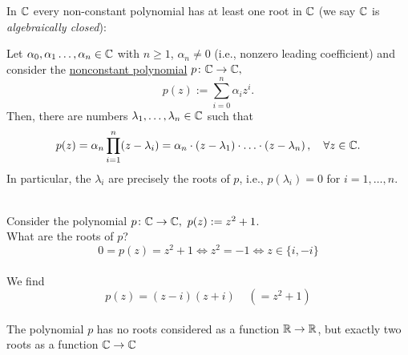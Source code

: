 \begin{frame}
In ${\mathbb{C}}$ every non-constant polynomial has at least one root in ${\mathbb{C}}$ (we say ${\mathbb{C}}$ is \textit{algebraically closed}): \vspace{-0.2cm}
\begin{theo}\label{theo:fundalg}
	Let $\alpha_0,\alpha_1\ldots, \alpha_n\in {\mathbb{C}}$ with $n\geq 1$, $\alpha_n \neq 0$ (i.e., nonzero leading coefficient) and consider the \underline{nonconstant polynomial} $p\colon {\mathbb{C}} \to {\mathbb{C}},$	
	$$p(z):=\sum_{i=0}^n\alpha_iz^i.$$
	Then, there are numbers $\lambda_1,\ldots, \lambda_n\in {\mathbb{C}}$ such that
	\[
	p(z)=\alpha_n \prod_{i=1}^{n} (z-\lambda_i)=\alpha_n\cdot (z-\lambda_1)\cdot\ldots\cdot (z-\lambda_n)\, ,\  ~~\forall z\in{\mathbb{C}}.
	\]
	 In particular, the $\lambda_i$ are precisely the roots of $p$, i.e., $p(\lambda_i) = 0$ for $i=1,\ldots,n$.
\end{theo}

\vspace{0.6cm}
\begin{ex} 
	\blank
	~\\
	Consider the polynomial $p\colon{\mathbb{C}}\to{\mathbb{C}},~p(z) := z^2 +1$.\\
	
	What are the roots of $p$?  
	$$0=p(z)=z^2 +1   \Leftrightarrow z^2 = -1 \Leftrightarrow z \in \{i,-i\}$$
	~\\
	We find
	$$p(z) = (z-i)(z+i) ~~~~~(=z^2+1) $$
	~\\
	The polynomial $p$ has no roots considered as a function ${\mathbb{R}}\to{\mathbb{R}}$, but exactly two roots as a function ${\mathbb{C}}\to{\mathbb{C}}$
\end{ex}
\end{frame}


